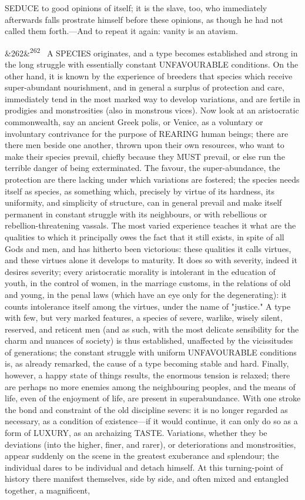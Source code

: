 \documentclass[12pt]{article}
\newcommand{\para}[1][]{\par\noindent\ifx&#1&\else\textsuperscript{\footnotesize #1}~\fi}
\begin{document}
SEDUCE to good opinions of itself; it is the slave, too, who immediately afterwards falls prostrate himself before these opinions, as though he had not called them forth.---And to repeat it again: vanity is an atavism.

\para[262] A SPECIES originates, and a type becomes established and strong in the long struggle with essentially constant UNFAVOURABLE conditions. On the other hand, it is known by the experience of breeders that species which receive super-abundant nourishment, and in general a surplus of protection and care, immediately tend in the most marked way to develop variations, and are fertile in prodigies and monstrosities (also in monstrous vices). Now look at an aristocratic commonwealth, say an ancient Greek polis, or Venice, as a voluntary or involuntary contrivance for the purpose of REARING human beings; there are there men beside one another, thrown upon their own resources, who want to make their species prevail, chiefly because they MUST prevail, or else run the terrible danger of being exterminated. The favour, the super-abundance, the protection are there lacking under which variations are fostered; the species needs itself as species, as something which, precisely by virtue of its hardness, its uniformity, and simplicity of structure, can in general prevail and make itself permanent in constant struggle with its neighbours, or with rebellious or rebellion-threatening vassals. The most varied experience teaches it what are the qualities to which it principally owes the fact that it still exists, in spite of all Gods and men, and has hitherto been victorious: these qualities it calls virtues, and these virtues alone it develops to maturity. It does so with severity, indeed it desires severity; every aristocratic morality is intolerant in the education of youth, in the control of women, in the marriage customs, in the relations of old and young, in the penal laws (which have an eye only for the degenerating): it counts intolerance itself among the virtues, under the name of "justice." A type with few, but very marked features, a species of severe, warlike, wisely silent, reserved, and reticent men (and as such, with the most delicate sensibility for the charm and nuances of society) is thus established, unaffected by the vicissitudes of generations; the constant struggle with uniform UNFAVOURABLE conditions is, as already remarked, the cause of a type becoming stable and hard. Finally, however, a happy state of things results, the enormous tension is relaxed; there are perhaps no more enemies among the neighbouring peoples, and the means of life, even of the enjoyment of life, are present in superabundance. With one stroke the bond and constraint of the old discipline severs: it is no longer regarded as necessary, as a condition of existence---if it would continue, it can only do so as a form of LUXURY, as an archaizing TASTE. Variations, whether they be deviations (into the higher, finer, and rarer), or deteriorations and monstrosities, appear suddenly on the scene in the greatest exuberance and splendour; the individual dares to be individual and detach himself. At this turning-point of history there manifest themselves, side by side, and often mixed and entangled together, a magnificent, 
\end{document}
